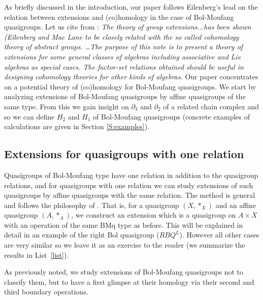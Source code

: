 \documentclass[11pt]{amsart}
\theoremstyle{definition}
\begin{document}
As briefly discussed in the introduction, our paper follows Eilenberg's lead on the relation between extensions and (co)homology in the case of Bol-Moufang quasigroups.
Let us cite from \cite{Eil}: {\it The theory of group extensions...has been shown (Eilenberg and Mac Lane \cite{EM12} to be
closely related with the so called cohomology theory of abstract groups. \ldots The purpose of this note is to present a theory
of extensions for some general classes of algebras including associative and Lie algebras as special cases. The factor-set
relations obtained should be useful in designing cohomology theories for other kinds of algebras.}
Our paper concentrates on a potential theory of (co)homology for Bol-Moufang quasigroups. We start by analyzing extensions of Bol-Moufang quasigroups
by affine quasigroups of the same type. From this we gain insight on $\partial_3$ and $\partial_2$ of a related chain complex and so we can define
$H_2$ and $H_1$ of Bol-Moufang quasigroups (concrete examples of calculations are given in Section \ref{S:examples}).

\subsection{Extensions for quasigroups with one relation}\label{S:EQR}
Quasigroups of Bol-Moufang type have one relation in addition to the quasigroup relations, and for quasigroups with one relation we can study extensions of such quasigroups by affine quasigroups with the same relation. The method is general and follows the philosophy of \cite{Eil}. That is, for a quasigroup $(X,*_X)$ and an affine quasigroup $(A,*_A)$, we construct an extension which is a quasigroup on $A\times X$ with an operation of the same BMq type as before. This will be explained in detail in an example of the right Bol quasigroup ($RBQ^L$). However all other cases are very similar so we leave it as an exercise to the reader (we summarize the results in List~\ref{list}).

As previously noted, we study extensions of Bol-Moufang quasigroups not to classify them, but to have a first glimpse at their homology via their second and third boundary operations.
\end{document}
